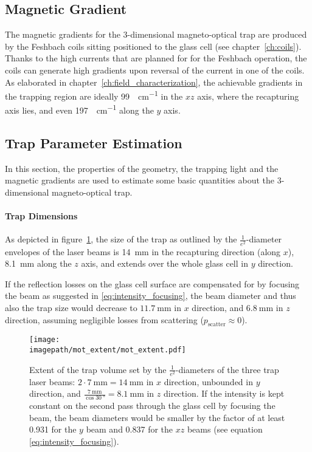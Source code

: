 \subsection*{Magnetic Gradient}
The magnetic gradients for the 3-dimensional magneto-optical trap are produced by the Feshbach coils sitting positioned to the glass cell (see chapter~\ref{ch:coils}). Thanks to the high currents that are planned for for the Feshbach operation, the coils can generate high gradients upon reversal of the current in one of the coils. As elaborated in chapter~\ref{ch:field_characterization}, the achievable gradients in the trapping region are ideally \SI{99}{\gauss\per\centi\meter} in the $xz$ axis, where the recapturing axis lies, and even \SI{197}{\gauss\per\centi\meter} along the $y$ axis.



\subsection*{Trap Parameter Estimation}
In this section, the properties of the geometry, the trapping light and the magnetic gradients are used to estimate some basic quantities about the 3-dimensional magneto-optical trap.

\paragraph{Trap Dimensions}
As depicted in figure~\ref{fig:mot_extent}, the size of the trap as outlined by the $\frac{1}{e^2}$-diameter envelopes of the laser beams is \SI[]{14}{\milli\meter} in the recapturing direction (along $x$), \SI[]{8.1}{\milli\meter} along the $z$ axis, and extends over the whole glass cell in $y$ direction.

If the reflection losses on the glass cell surface are compensated for by focusing the beam as suggested in \eqref{eq:intensity_focusing}, the beam diameter and thus also the trap size would decrease to $\SI[]{11.7}{\milli\meter}$ in $x$ direction, and $\SI[]{6.8}{\milli\meter}$ in $z$ direction, assuming negligible losses from scattering ($p_\text{scatter} \approx 0$).

\begin{figure}
    \centering
    \texttt{[image: \\imagepath/mot\_extent/mot\_extent.pdf]}
    \caption{Extent of the trap volume set by the $\frac{1}{e^2}$-diameters of the three trap laser beams: $2\cdot \SI[]{7}{\milli\meter} = \SI[]{14}{\milli\meter}$ in $x$ direction, unbounded in $y$ direction, and $\frac{\SI[]{7}{\milli\meter}}{\cos \SI[]{30}{\degree}} = \SI[]{8.1}{\milli\meter}$ in $z$ direction. If the intensity is kept constant on the second pass through the glass cell by focusing the beam, the beam diameters would be smaller by the factor of at least \SI{0.931}{} for the $y$ beam and \SI{0.837}{} for the $xz$ beams (see equation \ref{eq:intensity_focusing}).}
    \label{fig:mot_extent}
\end{figure}

